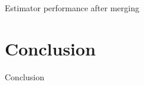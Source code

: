 \documentclass[aspectratio=1610, professionalfonts, 9pt]{beamer}
\begin{document}
  \begin{frame}{Estimator performance after merging}
  \end{frame}


\section{Conclusion}
  \begin{frame}{Conclusion}
  \end{frame}
\end{document}
